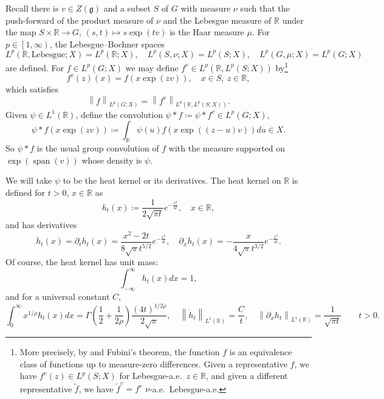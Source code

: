 \documentclass[11pt,reqno]{amsart}
\newcommand{\1}{\mathbf 1}
\begin{document}
Recall there is $v\in Z\left(\mathfrak{g}\right)$ and a subset $S$ of $G$ with measure $\nu$ such that the push-forward of the product measure of $\nu$ and the Lebesgue measure of $\mathbb{R}$ under the map $S\times \mathbb{R}\to G$, $\left(s,t\right)\mapsto s\exp\left(tv\right)$ is the Haar measure $\mu$. For $p\in \left[1,\infty\right)$, the Lebesgue--Bochner spaces
\[
L^p\left(\mathbb{R},\mathrm{Lebesgue};X\right)=L^p\left(\mathbb{R};X\right), \quad L^p\left(S,\nu;X\right)=L^p\left(S;X\right), \quad L^p\left(G,\mu;X\right)=L^p\left(G;X\right)
\]
are defined. For $f\in L^p\left(G;X\right)$ we may define $f^v\in L^p\left(\mathbb{R}, L^p\left(S;X\right)\right)$ by\footnote{More precisely, by \cite[Theorem 3(1)]{bogdanowicz1965fubini} and Fubini's theorem, the function $f$ is an equivalence class of functions up to measure-zero differences. Given a representative $f$, we have $f^v\left(z\right)\in L^p\left(S;X\right)$ for Lebesgue-a.e.~$z\in \mathbb{R}$, and given a different representative $\tilde{f}$, we have $\tilde{f}^v=f^v$ $\nu$-a.e.~Lebesgue-a.e.}
\begin{equation}\label{eq:fvdef}
    f^v\left(z\right)\left(x\right)=f\left(x\exp\left(zv\right)\right),\quad x\in S,~z\in \mathbb{R},
\end{equation}
which satisfies
\begin{equation}\label{eq:Lebesgue-Bochner}
\left\|f\right\|_{L^p\left(G;X\right)}=\left\|f^v\right\|_{L^p\left(\mathbb{R}, L^p\left(S;X\right)\right)}.
\end{equation}
Given $\psi\in L^1\left(\mathbb{R}\right)$, define the convolution $\psi*f\coloneqq \psi*f^v\in L^p\left(G;X\right)$,
\begin{equation*}
    \psi*f\left(x \exp\left(zv\right)\right)\coloneqq \int_\mathbb{R} \psi\left(u\right) f\left(x\exp\left(\left(z-u\right)v\right)\right)du\in X.
\end{equation*}
So $\psi*f$ is the usual group convolution of $f$ with the measure supported on $\exp\left(\operatorname{span}\left(v\right)\right)$ whose density is $\psi$.

We will take $\psi$ to be the heat kernel or its derivatives. The heat kernel on $\mathbb{R}$ is defined for $t>0$, $x\in \mathbb{R}$ as
\[
h_t\left(x\right)\coloneqq \frac{1}{2\sqrt{\pi t}}e^{-\frac{x^2}{4t}},\quad x\in \mathbb{R},
\]
and has derivatives
\[
\dot{h}_t\left(x\right)=\partial_t h_t\left(x\right)=\frac{x^2-2t}{8\sqrt{\pi}t^{5/2}}e^{-\frac{x^2}{4t}},\quad \partial_x h_t\left(x\right)=-\frac{x}{4\sqrt{\pi }t^{3/2}}e^{-\frac{x^2}{4t}}.
\]
Of course, the heat kernel has unit mass:
\begin{equation}\label{eq:heat-unitmass}
\int_{-\infty}^\infty h_t\left(x\right)dx=1,
\end{equation}
and for a universal constant $C$,
\begin{equation}\label{hintegrals}
\int_0^\infty x^{1/\rho}h_t\left(x\right)dx=\Gamma\left(\frac{1}{2}+\frac{1}{2\rho}\right)\frac{\left(4t\right)^{1/{2\rho}}}{2\sqrt{\pi}},\quad \left\|\dot{h}_t\right\|_{L^1\left(\mathbb{R}\right)}=\frac{C}{t},\quad \left\|\partial_x h_t\right\|_{L^1\left(\mathbb{R}\right)}=\frac{1}{\sqrt{\pi t}}\qquad t>0.
\end{equation}
\end{document}
